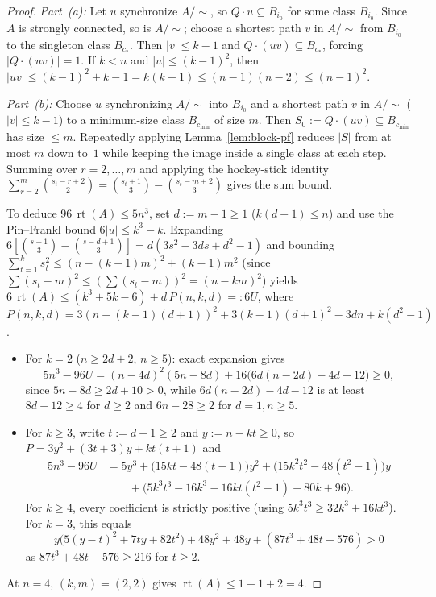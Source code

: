\documentclass[11pt,a4paper]{article}
\theoremstyle{definition}
\theoremstyle{remark}
\newcommand{\rt}{\operatorname{rt}}
\begin{document}
\begin{proof}
\emph{Part~(a):} Let $u$ synchronize $A/\sim$, so $Q \cdot u \subseteq B_{i_0}$ for some class $B_{i_0}$. Since $A$ is strongly connected, so is $A/\sim$; choose a shortest path $v$ in $A/\sim$ from $B_{i_0}$ to the singleton class $B_{c_*}$. Then $|v| \le k - 1$ and $Q \cdot (uv) \subseteq B_{c_*}$, forcing $|Q \cdot (uv)| = 1$. If $k < n$ and $|u| \le (k - 1)^2$, then $|uv| \le (k - 1)^2 + k - 1 = k(k - 1) \le (n - 1)(n - 2) \le (n - 1)^2$.

\emph{Part~(b):} Choose $u$ synchronizing $A/\sim$ into $B_{i_0}$ and a shortest path $v$ in $A/\sim$ ($|v| \le k - 1$) to a minimum-size class $B_{c_{\min}}$ of size $m$. Then $S_0 := Q \cdot (uv) \subseteq B_{c_{\min}}$ has size $\le m$. Repeatedly applying Lemma~\ref{lem:block-pf} reduces $|S|$ from at most $m$ down to~$1$ while keeping the image inside a single class at each step. Summing over $r = 2, \dots, m$ and applying the hockey-stick identity $\sum_{r=2}^m \binom{s_t - r + 2}{2} = \binom{s_t + 1}{3} - \binom{s_t - m + 2}{3}$ gives the sum bound.

To deduce $96\,\rt(A) \le 5n^3$, set $d := m - 1 \ge 1$ ($k(d + 1) \le n$) and use the Pin--Frankl bound $6|u| \le k^3 - k$. Expanding $6[\binom{s+1}{3} - \binom{s-d+1}{3}] = d(3s^2 - 3ds + d^2 - 1)$ and bounding $\sum_{t=1}^k s_t^2 \le (n - (k - 1)m)^2 + (k - 1)m^2$ (since $\sum (s_t - m)^2 \le (\sum (s_t - m))^2 = (n - km)^2$) yields $6\,\rt(A) \le (k^3 + 5k - 6) + d\, P(n, k, d) =: 6 U$, where $P(n, k, d) = 3(n - (k - 1)(d + 1))^2 + 3(k - 1)(d + 1)^2 - 3dn + k(d^2 - 1)$.
\begin{itemize}[leftmargin=*,nosep]
  \item For $k = 2$ ($n \ge 2d + 2$, $n \ge 5$): exact expansion gives
  \[
    5n^3 - 96 U = (n - 4d)^2 (5n - 8d) + 16\bigl(6d(n - 2d) - 4d - 12\bigr) \ge 0,
  \]
  since $5n - 8d \ge 2d + 10 > 0$, while $6d(n - 2d) - 4d - 12$ is at least $8d - 12 \ge 4$ for $d \ge 2$ and $6n - 28 \ge 2$ for $d = 1, n \ge 5$.
  \item For $k \ge 3$, write $t := d + 1 \ge 2$ and $y := n - kt \ge 0$, so $P = 3y^2 + (3t + 3)y + kt(t + 1)$ and
  \begin{align*}
    5n^3 - 96 U &= 5y^3 + \bigl(15kt - 48(t-1)\bigr)y^2 + \bigl(15k^2t^2 - 48(t^2-1)\bigr)y \\
    &\qquad + \bigl(5k^3t^3 - 16k^3 - 16kt(t^2-1) - 80k + 96\bigr).
  \end{align*}
  For $k \ge 4$, every coefficient is strictly positive (using $5k^3 t^3 \ge 32k^3 + 16k t^3$). For $k = 3$, this equals
  \[
    y\bigl(5(y - t)^2 + 7ty + 82t^2\bigr) + 48y^2 + 48y + (87t^3 + 48t - 576) > 0
  \]
  as $87t^3 + 48t - 576 \ge 216$ for $t \ge 2$.
\end{itemize}
At $n = 4$, $(k, m) = (2, 2)$ gives $\rt(A) \le 1 + 1 + 2 = 4$.


\end{proof}
\end{document}
